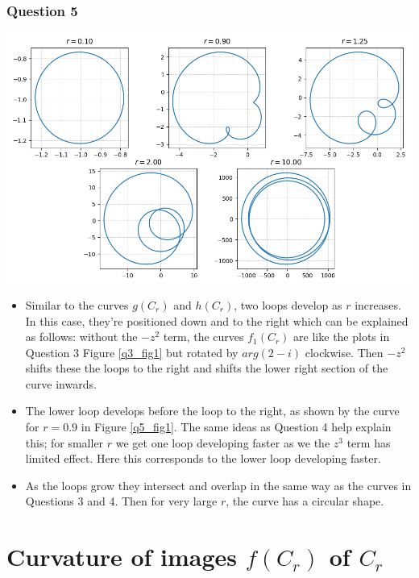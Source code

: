 \documentclass[12pt, a4paper]{article}
\begin{document}
\subsubsection*{Question 5}

\begin{minipage}{\textwidth}
	\includegraphics[width=\linewidth]{q5_fig1}
	\label{q5_fig1}
\end{minipage}
\begin{itemize}[topsep = 8pt, leftmargin = *]
	\itemsep 0em
	\item Similar to the curves $g(C_{r})$ and $h(C_{r})$, two loops develop as $r$ increases. In this case, they're positioned down and to the right which can be explained as follows: without the $-z^{2}$ term, the curves $f_{1}(C_{r})$ are like the plots in Question 3 Figure \ref{q3_fig1} but rotated by $arg(2-i)$ clockwise. Then $-z^{2}$ shifts these the loops to the right and shifts the lower right section of the curve inwards.
	\item The lower loop develops before the loop to the right, as shown by the curve for $r = 0.9$ in Figure \ref{q5_fig1}. The same ideas as Question 4 help explain this; for smaller $r$ we get one loop developing faster as we the $z^{3}$ term has limited effect. Here this corresponds to the lower loop developing faster.
	\item As the loops grow they intersect and overlap in the same way as the curves in Questions 3 and 4. Then for very large $r$, the curve has a circular shape.
\end{itemize}


\section{Curvature of images $f(C_{r})$ of $C_{r}$}
\end{document}
